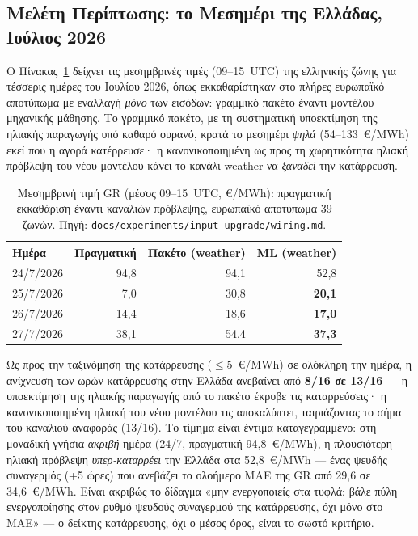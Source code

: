 \subsection{Μελέτη Περίπτωσης: το Μεσημέρι της Ελλάδας, Ιούλιος 2026}
\label{subsec:gr-collapse}

Ο Πίνακας~\ref{tab:gr-collapse} δείχνει τις μεσημβρινές τιμές (09--15~UTC) της ελληνικής ζώνης για τέσσερις ημέρες του Ιουλίου 2026, όπως εκκαθαρίστηκαν στο πλήρες ευρωπαϊκό αποτύπωμα με εναλλαγή \emph{μόνο} των εισόδων: γραμμικό πακέτο έναντι μοντέλου μηχανικής μάθησης. Το γραμμικό πακέτο, με τη συστηματική υποεκτίμηση της ηλιακής παραγωγής υπό καθαρό ουρανό, κρατά το μεσημέρι \emph{ψηλά} (54--133~€/MWh) εκεί που η αγορά κατέρρευσε· η κανονικοποιημένη ως προς τη χωρητικότητα ηλιακή πρόβλεψη του νέου μοντέλου κάνει το κανάλι weather να \emph{ξαναδεί} την κατάρρευση.

\begin{table}[htbp]
\centering
\caption{Μεσημβρινή τιμή GR (μέσος 09--15~UTC, €/MWh): πραγματική εκκαθάριση έναντι καναλιών πρόβλεψης, ευρωπαϊκό αποτύπωμα 39 ζωνών. Πηγή: \texttt{docs/experiments/input-upgrade/wiring.md}.}
\label{tab:gr-collapse}
\begin{tabular}{@{}lrrr@{}}
\toprule
\textbf{Ημέρα} & \textbf{Πραγματική} & \textbf{Πακέτο (weather)} & \textbf{ML (weather)} \\
\midrule
24/7/2026 & 94,8 & 94,1 & 52,8 \\
25/7/2026 & 7,0 & 30,8 & \textbf{20,1} \\
26/7/2026 & 14,4 & 18,6 & \textbf{17,0} \\
27/7/2026 & 38,1 & 54,4 & \textbf{37,3} \\
\bottomrule
\end{tabular}
\end{table}

Ως προς την ταξινόμηση της κατάρρευσης ($\le 5$~€/MWh) σε ολόκληρη την ημέρα, η ανίχνευση των ωρών κατάρρευσης στην Ελλάδα ανεβαίνει από \textbf{8/16 σε 13/16} --- η υποεκτίμηση της ηλιακής παραγωγής από το πακέτο έκρυβε τις καταρρεύσεις· η κανονικοποιημένη ηλιακή του νέου μοντέλου τις αποκαλύπτει, ταιριάζοντας το σήμα του καναλιού αναφοράς (13/16). Το τίμημα είναι έντιμα καταγεγραμμένο: στη μοναδική γνήσια \emph{ακριβή} ημέρα (24/7, πραγματική 94,8~€/MWh), η πλουσιότερη ηλιακή πρόβλεψη \emph{υπερ-καταρρέει} την Ελλάδα στα 52,8~€/MWh --- ένας ψευδής συναγερμός (+5 ώρες) που ανεβάζει το ολοήμερο MAE της GR από 29,6 σε 34,6~€/MWh. Είναι ακριβώς το δίδαγμα «μην ενεργοποιείς στα τυφλά: βάλε πύλη ενεργοποίησης στον ρυθμό ψευδούς συναγερμού της κατάρρευσης, όχι μόνο στο MAE» --- ο δείκτης κατάρρευσης, όχι ο μέσος όρος, είναι το σωστό κριτήριο.

